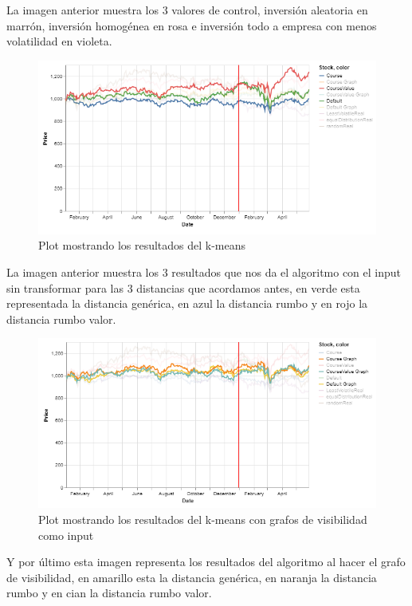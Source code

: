 \documentclass[12pt,a4paper]{article}
\begin{document}
		La imagen anterior muestra los 3 valores de control, inversión aleatoria en marrón, inversión homogénea en rosa e inversión todo a empresa con menos volatilidad en violeta.\\
		\begin{figure}[H]
    		\centering
    		\includegraphics[scale=1]{results 1 year k=4 estandar}\par
    		\caption{Plot mostrando los resultados del k-means}
		\end{figure}
		La imagen anterior muestra los 3 resultados que nos da el algoritmo con el input sin transformar para las 3 distancias que acordamos antes, en verde esta representada la distancia genérica, en azul la distancia rumbo y en rojo la distancia rumbo valor.\\
		\begin{figure}[H]
    		\centering
    		\includegraphics[scale=1]{results 1 year k=4 grafo}\par
    		\caption{Plot mostrando los resultados del k-means con grafos de visibilidad como input}
		\end{figure}
		Y por último esta imagen representa los resultados del algoritmo al hacer el grafo de visibilidad, en amarillo esta la distancia genérica, en naranja la distancia rumbo y en cian la distancia rumbo valor.\\
\end{document}
